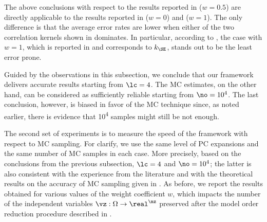 The above conclusions with respect to the results reported in
 ($w = 0.5$) are directly applicable to the
results reported in  ($w = 0$) and
 ($w = 1$). The only difference is that the
average error rates are lower when either of the two correlation kernels shown
in  dominates. In particular, according to
\error{\variance}, the case with $w = 1$, which is reported in
 and corresponds to $k_\SE$, stands out to be
the least error prone.

Guided by the observations in this subsection, we conclude that our framework
delivers accurate results starting from $\lc = 4$. The \ac{MC} estimates, on the
other hand, can be considered as sufficiently reliable starting from $\no =
10^4$. The last conclusion, however, is biased in favor of the \ac{MC} technique
since, as noted earlier, there is evidence that 10\textsuperscript{4} samples
might still be not enough.


The second set of experiments is to measure the speed of the framework with
respect to \ac{MC} sampling. For clarify, we use the same level of \ac{PC}
expansions and the same number of \ac{MC} samples in each case. More precisely,
based on the conclusions from the previous subsection, $\lc = 4$ and $\no =
10^4$; the latter is also consistent with the experience from the literature
\cite{ghanta2006, bhardwaj2008, huang2009a, shen2009, lee2013} and with the
theoretical results on the accuracy of \ac{MC} sampling given in
\cite{diaz-emparanza2002}. As before, we report the results obtained for various
values of the weight coefficient $w$, which impacts the number of the
independent variables $\vz: \Omega \to \real^\nz$ preserved after the model
order reduction procedure described in .

